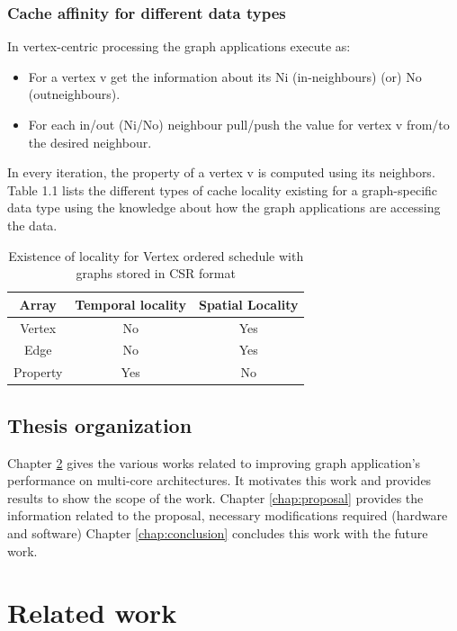 \documentclass[a4paper,12pt, final]{report}
\begin{document}
\subsection{Cache affinity for different data types}
In vertex-centric processing the graph applications execute as:
\begin{itemize}
    \setlength\itemsep{0 em}
    \item For a vertex v get the information about its Ni (in-neighbours) (or) No (outneighbours).
    \item For each in/out (Ni/No) neighbour pull/push the value for vertex v from/to the
desired neighbour.
\end{itemize}
In every iteration, the property of a vertex v is computed using its neighbors. Table 1.1
lists the different types of cache locality existing for a graph-specific data type using the
knowledge about how the graph applications are accessing the data.

\begin{table}[]
    \centering
    \begin{tabular}{|c||c|c|} \hline
         Array  & Temporal locality & Spatial Locality  \\ \hline\hline
         Vertex & No & Yes \\ \hline
         Edge  & No & Yes\\ \hline
        Property & Yes &  No  \\\hline
    \end{tabular}
    \caption{Existence of locality for Vertex ordered schedule with graphs stored in CSR
format}
    \label{tab:my_label}
\end{table}

\section{Thesis organization}
Chapter \ref{chap:relatedWorks} gives the various works related to improving graph application's performance
on multi-core architectures. It motivates this work and provides results to show the
scope of the work. Chapter \ref{chap:proposal} provides the information related to the proposal, necessary
modifications required (hardware and software)
Chapter \ref{chap:conclusion} concludes this work with the future work.

\chapter{Related work}\label{chap:relatedWorks}
\end{document}
